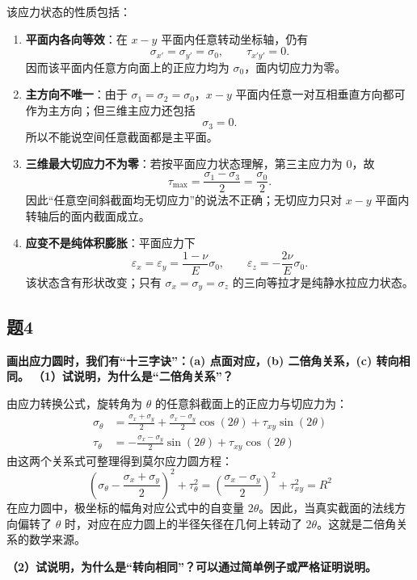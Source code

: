 \documentclass[UTF8,fontset=windows]{ctexart}
\begin{document}
该应力状态的性质包括：
\begin{enumerate}
    \item \textbf{平面内各向等效}：在 $x-y$ 平面内任意转动坐标轴，仍有
    \[
    \sigma_{x'}=\sigma_{y'}=\sigma_0,\qquad \tau_{x'y'}=0.
    \]
    因而该平面内任意方向面上的正应力均为 $\sigma_0$，面内切应力为零。
    \item \textbf{主方向不唯一}：由于 $\sigma_1=\sigma_2=\sigma_0$，$x-y$ 平面内任意一对互相垂直方向都可作为主方向；但三维主应力还包括
    \[
    \sigma_3=0.
    \]
    所以不能说空间任意截面都是主平面。
    \item \textbf{三维最大切应力不为零}：若按平面应力状态理解，第三主应力为 $0$，故
    \[
    \tau_{\max}=\frac{\sigma_1-\sigma_3}{2}=\frac{\sigma_0}{2}.
    \]
    因此“任意空间斜截面均无切应力”的说法不正确；无切应力只对 $x-y$ 平面内转轴后的面内截面成立。
    \item \textbf{应变不是纯体积膨胀}：平面应力下
    \[
    \varepsilon_x=\varepsilon_y=\frac{1-\nu}{E}\sigma_0,\qquad
    \varepsilon_z=-\frac{2\nu}{E}\sigma_0.
    \]
    该状态含有形状改变；只有 $\sigma_x=\sigma_y=\sigma_z$ 的三向等拉才是纯静水拉应力状态。
\end{enumerate}

\subsection*{题4}
\textbf{画出应力圆时，我们有“十三字诀”：(a) 点面对应，(b) 二倍角关系，(c) 转向相同。}
\textbf{（1）试说明，为什么是“二倍角关系”？}

由应力转换公式，旋转角为 $\theta$ 的任意斜截面上的正应力与切应力为：
\[
    \begin{aligned}
        \sigma_\theta &= \frac{\sigma_x + \sigma_y}{2} + \frac{\sigma_x - \sigma_y}{2} \cos(2\theta) + \tau_{xy} \sin(2\theta) \\
        \tau_\theta &= -\frac{\sigma_x - \sigma_y}{2} \sin(2\theta) + \tau_{xy} \cos(2\theta)
    \end{aligned}
\]
由这两个关系式可整理得到莫尔应力圆方程：
\[
    \left(\sigma_\theta - \frac{\sigma_x + \sigma_y}{2}\right)^2 + \tau_\theta^2 = \left(\frac{\sigma_x - \sigma_y}{2}\right)^2 + \tau_{xy}^2 = R^2
\]
在应力圆中，极坐标的幅角对应公式中的自变量 $2\theta$。因此，当真实截面的法线方向偏转了 $\theta$ 时，对应在应力圆上的半径矢径在几何上转动了 $2\theta$。这就是二倍角关系的数学来源。

\textbf{（2）试说明，为什么是“转向相同”？可以通过简单例子或严格证明说明。}
\end{document}
